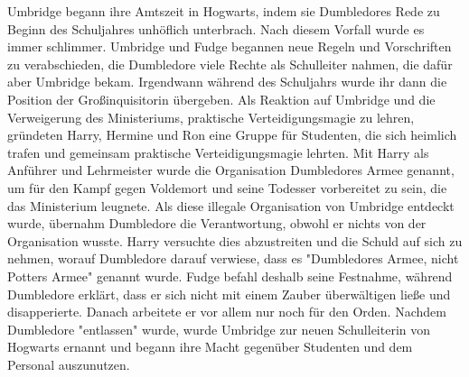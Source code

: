 \documentclass[a4paper, 10pt]{article}
\begin{document}
\vspace{10pt}
\newline
Umbridge begann ihre Amtszeit in Hogwarts, indem sie Dumbledores Rede zu Beginn des Schuljahres unhöflich unterbrach. Nach diesem Vorfall wurde es immer schlimmer. Umbridge und Fudge begannen neue Regeln und Vorschriften zu verabschieden, die Dumbledore viele Rechte als Schulleiter nahmen, die dafür aber Umbridge bekam. Irgendwann während des Schuljahrs wurde ihr dann die Position der Großinquisitorin übergeben. Als Reaktion auf Umbridge und die Verweigerung des Ministeriums, praktische Verteidigungsmagie zu lehren, gründeten Harry, Hermine und Ron eine Gruppe für Studenten, die sich heimlich trafen und gemeinsam praktische Verteidigungsmagie lehrten. Mit Harry als Anführer und Lehrmeister wurde die Organisation Dumbledores Armee genannt, um für den Kampf gegen Voldemort und seine Todesser vorbereitet zu sein, die das Ministerium leugnete.
\vspace{10pt}
\newline
Als diese illegale Organisation von Umbridge entdeckt wurde, übernahm Dumbledore die Verantwortung, obwohl er nichts von der Organisation wusste. Harry versuchte dies abzustreiten und die Schuld auf sich zu nehmen, worauf Dumbledore darauf verwiese, dass es "Dumbledores Armee, nicht Potters Armee" genannt wurde. Fudge befahl deshalb seine Festnahme, während Dumbledore erklärt, dass er sich nicht mit einem Zauber überwältigen ließe und disapperierte. Danach arbeitete er vor allem nur noch für den Orden. Nachdem Dumbledore "entlassen" wurde, wurde Umbridge zur neuen Schulleiterin von Hogwarts ernannt und begann ihre Macht gegenüber Studenten und dem Personal auszunutzen.
\end{document}
